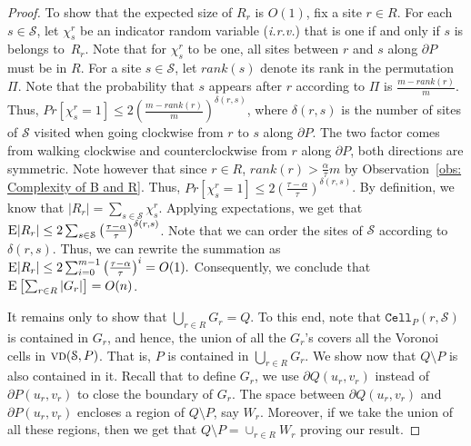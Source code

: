 \documentclass[a4paper,UKenglish]{socg-lipics-v2018}
\newcommand{\s}{\mathcal S}
\newcommand{\cell}[2][P]{\ensuremath{\mathtt{Cell}_{\scriptscriptstyle #1}(#2)}}
\newcommand{\vd}[2][P]{\textsc{vd}(#2, #1)}
\newcommand{\ex}[1]{\textsc{E}\left[#1\right]}
\newcommand{\exw}[1]{\textsc{E}#1}
\begin{document}
{\begin{proof}
To show that the expected size of $R_r$ is $O(1)$, fix a site $r\in R$. 
For each $s\in \s$, let $\chi^r_s$ be an indicator random variable (\emph{i.r.v.}) that is one if and only if $s$ is belongs to~$R_r$.
Note that for $\chi^r_s$ to be one, all sites between $r$ and $s$ along $\partial P$ must be in $R$.
For a site $s\in \s$, let $rank(s)$ denote its rank in the permutation $\Pi$. 
Note that the probability that $s$ appears after $r$ according to $\Pi$ is $\frac{m-rank(r)}{m}$.
Thus, $Pr[\chi^r_s = 1] \leq 2\left(\frac{m-rank(r)}{m}\right )^{\delta(r,s)}$, where $\delta(r,s)$ is the number of sites of $\s$ visited when going clockwise from $r$ to $s$ along $\partial P$. 
The two factor comes from walking clockwise and counterclockwise from $r$ along $\partial P$, both directions are symmetric.
Note however that since $r\in R$, $rank(r) > \frac{\alpha}{\tau} m$ by Observation~\ref{obs: Complexity of B and R}.
Thus, $Pr[\chi^r_s = 1] \leq 2\left(\frac{\tau - \alpha}{\tau}\right)^{\delta(r,s)}$.
By definition, we know that $|R_r| = \sum_{s\in \s} \chi^r_s$.
Applying expectations, we get that $\exw{|R_r|} \leq 2 \sum_{s\in \s} \left(\frac{\tau - \alpha}{\tau}\right)^{\delta(r,s)}$. 
Note that we can order the sites of $\s$ according to $\delta(r, s)$.
Thus, we can rewrite the summation as \linebreak
$\exw{ |R_r| } \leq 2 \sum_{i = 0}^{m-1} \left(\frac{\tau - \alpha}{\tau}\right)^{i}  = O(1).$
Consequently, we conclude that $ \ex{\sum_{r\in R} |G_r|} = O(n)$.

It remains only to show that $\bigcup_{r\in R} G_r = Q$. To this end, note that $\cell{r, \s}$ is contained in $G_r$, and hence, the union of all the $G_r$'s covers all the Voronoi cells in $\vd{\s}$.
That is, $P$ is contained in $\bigcup_{r\in R} G_r$. We show now that $Q\setminus P$ is also contained in it. 
Recall that to define $G_r$, we use $\partial Q(u_r, v_r)$ instead of $\partial P(u_r, v_r)$ to close the boundary of $G_r$. The space between $\partial Q(u_r, v_r)$ and $\partial P(u_r, v_r)$ encloses a region of $Q\setminus P$, say $W_r$. Moreover, if we take the union of all these regions, then we get that $Q\setminus P = \cup_{r\in R} W_r$ proving our result.
\end{proof}
}

\end{document}
